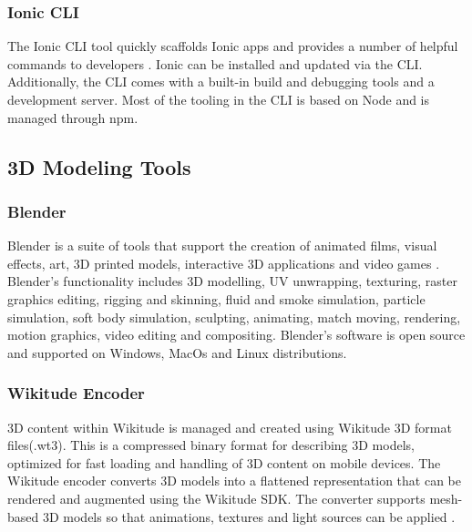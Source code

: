 \subsubsection{Ionic CLI}
The Ionic CLI tool quickly scaffolds Ionic apps and provides a number of helpful commands to developers \cite{ionicli}. Ionic can be installed and updated via the CLI. Additionally, the CLI comes with a built-in build and debugging tools and a development server. Most of the tooling in the CLI is based on Node and is managed through npm.

\subsection{3D Modeling Tools}

\subsubsection{Blender}
Blender is a  suite of tools that support the creation of animated films, visual effects, art, 3D printed models, interactive 3D applications and video games \cite{blender}. Blender’s functionality includes 3D modelling, UV unwrapping, texturing, raster graphics editing, rigging and skinning, fluid and smoke simulation, particle simulation, soft body simulation, sculpting, animating, match moving, rendering, motion graphics, video editing and compositing. Blender’s software is open source and supported on Windows, MacOs and Linux distributions. 

\subsubsection{Wikitude Encoder}
3D content within Wikitude is managed and created using Wikitude 3D format files(.wt3). This is a compressed binary format for describing 3D models, optimized for fast loading and handling of 3D content on mobile devices. The Wikitude encoder converts 3D models into a flattened representation that can be rendered and augmented using the Wikitude SDK. The converter supports mesh-based 3D models so  that animations, textures and light sources can be applied \cite{wikiencoder}. 


